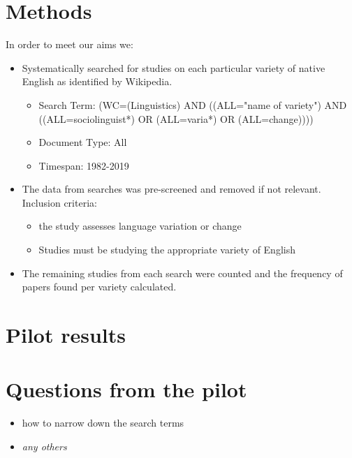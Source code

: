 \documentclass[a0paper,fleqn]{betterposter}
\begin{document}
{
	
\section{Methods}

In order to meet our aims we:
\begin{itemize}
	\item Systematically searched for studies on each particular variety of native English as identified by Wikipedia.
	\begin{itemize}
		\item Search Term: (WC=(Linguistics)  AND  ((ALL="name of variety")  AND  ((ALL=sociolinguist*)  OR  (ALL=varia*)  OR  (ALL=change))))
		\item Document Type: All
		\item Timespan: 1982-2019 
	\end{itemize}
	\item The data from searches was pre-screened and removed if not relevant. Inclusion criteria:
	\begin{itemize}
		\item the study assesses language variation or change
		\item Studies must be studying the appropriate variety of English
	\end{itemize}
	\item The remaining studies from each search were counted and the frequency of papers found per variety calculated.

\end{itemize}



\section{Pilot results}

\section{Questions from the pilot}
\begin{itemize}
	\item how to narrow down the search terms
	\item \textit{any others}
\end{itemize}



}


\begin{enumerate}
	\
\end{enumerate}
\end{document}
